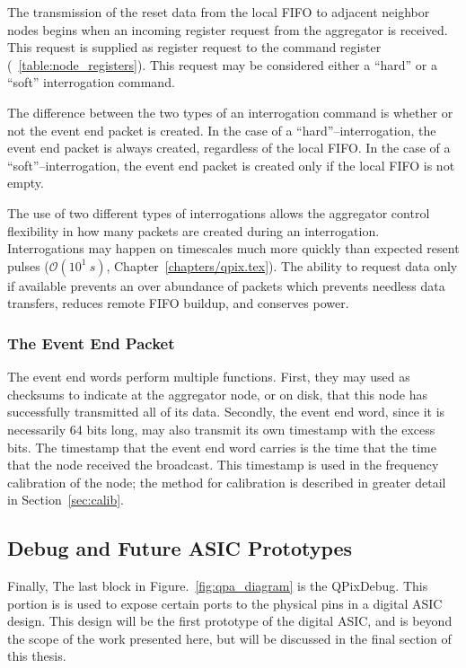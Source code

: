 The transmission of the reset data from the local FIFO to adjacent neighbor nodes begins when an incoming register request from the aggregator is received.
This request is supplied as register request to the command register (~\ref{table:node_registers}).
This request may be considered either a ``hard'' or a ``soft'' interrogation command.

The difference between the two types of an interrogation command is whether or not the event end packet is created.
In the case of a ``hard''--interrogation, the event end packet is always created, regardless of the local FIFO.
In the case of a ``soft''--interrogation, the event end packet is created only if the local FIFO is not empty.

The use of two different types of interrogations allows the aggregator control flexibility in how many packets are created during an interrogation.
Interrogations may happen on timescales much more quickly than expected resent pulses ($\mathcal{O}(10^{1}~\unit{s})$, Chapter~\ref{chapters/qpix.tex}).
The ability to request data only if available prevents an over abundance of packets which prevents needless data transfers, reduces remote FIFO buildup, and conserves power.

\subsubsection{The Event End Packet}

The event end words perform multiple functions.
First, they may used as checksums to indicate at the aggregator node, or on disk, that this node has successfully transmitted all of its data.
Secondly, the event end word, since it is necessarily 64 bits long, may also transmit its own timestamp with the excess bits.
The timestamp that the event end word carries is the time that the time that the node received the broadcast.
This timestamp is used in the frequency calibration of the node; the method for calibration is described in greater detail in Section~\ref{sec:calib}.

\subsection{Debug and Future ASIC Prototypes}

Finally, The last block in Figure.~\ref{fig:qpa_diagram} is the QPixDebug.
This portion is is used to expose certain ports to the physical pins in a digital ASIC design.
This design will be the first prototype of the digital ASIC, and is beyond the scope of the work presented here, but will be discussed in the final section of this thesis.

